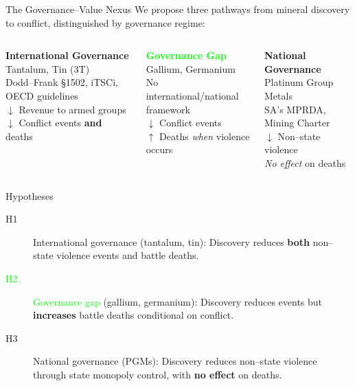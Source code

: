 \documentclass[aspectratio=169,11pt]{beamer}
\begin{document}
\begin{frame}{The Governance--Value Nexus}
We propose three pathways from mineral discovery to conflict, distinguished by governance regime:

\vspace{0.8em}
\begin{columns}[T]
\centering
\textcolor{sage}{\textbf{International Governance}}\\[4pt]
{\small Tantalum, Tin (3T)}\\[4pt]
{\footnotesize Dodd--Frank \S1502, iTSCi, OECD guidelines}\\[6pt]
{\footnotesize $\downarrow$ Revenue to armed groups\\$\downarrow$ Conflict events \textbf{and} deaths}

\centering
\textcolor{lime}{\textbf{Governance Gap}}\\[4pt]
{\small Gallium, Germanium}\\[4pt]
{\footnotesize No international/national framework}\\[6pt]
{\footnotesize $\downarrow$ Conflict events\\$\uparrow$ Deaths \textit{when} violence occurs}

\centering
\textcolor{muted}{\textbf{National Governance}}\\[4pt]
{\small Platinum Group Metals}\\[4pt]
{\footnotesize SA's MPRDA, Mining Charter}\\[6pt]
{\footnotesize $\downarrow$ Non--state violence\\\textit{No effect} on deaths}
\end{columns}
\end{frame}

\begin{frame}{Hypotheses}
\begin{description}
    \item[\textcolor{sage}{H1}] \textcolor{sage}{International governance} (tantalum, tin): Discovery reduces \textbf{both} non--state violence events and battle deaths.
    \vspace{0.4em}
    \item[\textcolor{lime}{H2}] \textcolor{lime}{Governance gap} (gallium, germanium): Discovery reduces events but \textbf{increases} battle deaths conditional on conflict.
    \vspace{0.4em}
    \item[\textcolor{muted}{H3}] \textcolor{muted}{National governance} (PGMs): Discovery reduces non--state violence through state monopoly control, with \textbf{no effect} on deaths.
\end{description}
\end{frame}
\end{document}

